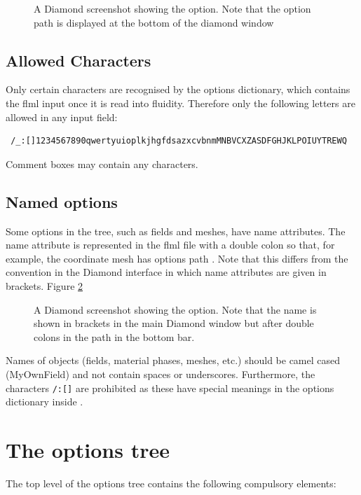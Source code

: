 \begin{figure}[ht]
  \centering
  \caption{A Diamond screenshot showing the 
    option. Note that the option path is displayed at the bottom of the
    diamond window}
  \label{fig:geometry_dimension}
\end{figure}

\subsection{Allowed Characters}
Only certain characters are recognised by the options dictionary, which contains the flml input once it is read into fluidity. Therefore only the following letters are allowed in any input field:

\begin{verbatim}
 /_:[]1234567890qwertyuioplkjhgfdsazxcvbnmMNBVCXZASDFGHJKLPOIUYTREWQ
\end{verbatim}

Comment boxes may contain any characters.

\subsection{Named options}
Some options in the tree, such as fields and meshes, have name
attributes. The name attribute is represented in the flml file with a double colon so that,
for example, the coordinate mesh has options path\onlypdf\linebreak
{}. Note that this differs from the
convention in the Diamond interface in which name attributes are given in brackets. Figure
\ref{fig:mesh_name}

\begin{figure}[ht]
  \centering
  \caption{A Diamond screenshot showing the 
    option. Note that the name is shown in brackets in the main Diamond
    window but after double colons in the path in the bottom bar.}
  \label{fig:mesh_name}
\end{figure}

Names of objects (fields, material phases, meshes, etc.) should be camel cased (MyOwnField) and not contain spaces or underscores. Furthermore, the characters \verb+/:[]+ are prohibited as these have special meanings in the options dictionary inside \fluidity.

\section{The options tree}\label{sec:OptionsTree}
The top level of the options tree contains the following compulsory elements:

